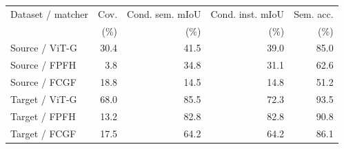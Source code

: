 \begin{tabular}{lrrrr}
\toprule
Dataset / matcher & Cov. & Cond. sem. mIoU & Cond. inst. mIoU & Sem. acc. \\
 & (\%) & (\%) & (\%) & (\%) \\
\midrule
Source / ViT-G & 30.4 & 41.5 & 39.0 & 85.0 \\
Source / FPFH & 3.8 & 34.8 & 31.1 & 62.6 \\
Source / FCGF & 18.8 & 14.5 & 14.8 & 51.2 \\
Target / ViT-G & 68.0 & 85.5 & 72.3 & 93.5 \\
Target / FPFH & 13.2 & 82.8 & 82.8 & 90.8 \\
Target / FCGF & 17.5 & 64.2 & 64.2 & 86.1 \\
\bottomrule
\end{tabular}
